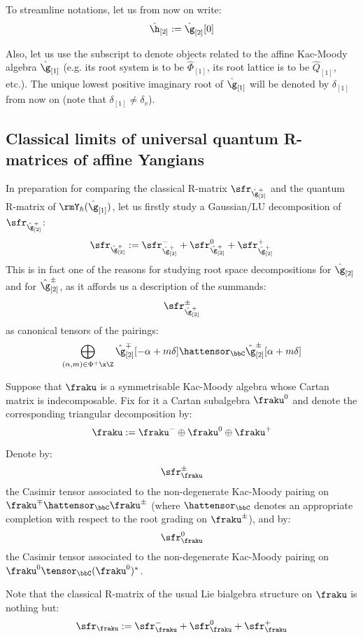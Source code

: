         \begin{convention}
            To streamline notations, let us from now on write:
                $$\hat{\h}_{[2]} := \hat{\g}_{[2]}[0]$$
            
            Also, let us use the subscript \say{$[1]$} to denote objects related to the affine Kac-Moody algebra $\hat{\g}_{[1]}$ (e.g. its root system is to be $\hat{\Phi}_{[1]}$, its root lattice is to be $\hat{Q}_{[1]}$, etc.). The unique lowest positive imaginary root of $\hat{\g}_{[1]}$ will be denoted by $\delta_{[1]}$ from now on (note that $\delta_{[1]} \not = \delta_v$).
        \end{convention}

        \newpage

    \subsection{Classical limits of universal quantum R-matrices of affine Yangians}
        In preparation for comparing the classical R-matrix $\sfr_{ \hat{\g}_{[2]}^+ }$ and the quantum R-matrix of $\rmY_{\hbar}(\hat{\g}_{[1]})$, let us firstly study a Gaussian/LU decomposition of $\sfr_{ \hat{\g}_{[2]}^+ }$:
            $$\sfr_{ \hat{\g}_{[2]}^+ } := \sfr_{ \hat{\g}_{[2]}^+ }^- + \sfr_{ \hat{\g}_{[2]}^+ }^0 + \sfr_{ \hat{\g}_{[2]}^+ }^+$$
        This is in fact one of the reasons for studying root space decompositions for $\hat{\g}_{[2]}$ and for $\hat{\g}_{[2]}^{\pm}$, as it affords us a description of the summands:
            $$\sfr_{ \hat{\g}_{[2]}^+ }^{\pm}$$
        as canonical tensors of the pairings:
            $$\bigoplus_{(\alpha, m) \in \Phi^+ \x \Z} \hat{\g}_{[2]}^{\mp}[-\alpha + m\delta] \hattensor_{\bbC} \hat{\g}_{[2]}^{\pm}[\alpha + m\delta]$$
        \begin{convention}
            Suppose that $\fraku$ is a symmetrisable Kac-Moody algebra whose Cartan matrix is indecomposable. Fix for it a Cartan subalgebra $\fraku^0$ and denote the corresponding triangular decomposition by:
                $$\fraku := \fraku^- \oplus \fraku^0 \oplus \fraku^+$$
        
            Denote by:
                $$\sfr_{\fraku}^{\pm}$$
            the Casimir tensor associated to the non-degenerate Kac-Moody pairing on $\fraku^{\mp} \hattensor_{\bbC} \fraku^{\pm}$ (where $\hattensor_{\bbC}$ denotes an appropriate completion with respect to the root grading on $\fraku^{\pm}$), and by:
                $$\sfr_{\fraku}^0$$
            the Casimir tensor associated to the non-degenerate Kac-Moody pairing on $\fraku^0 \tensor_{\bbC} (\fraku^0)^*$.

            Note that the classical R-matrix of the usual Lie bialgebra structure on $\fraku$ is nothing but:
                $$\sfr_{\fraku} := \sfr_{\fraku}^- + \sfr_{\fraku}^0 + \sfr_{\fraku}^+$$
        \end{convention}
